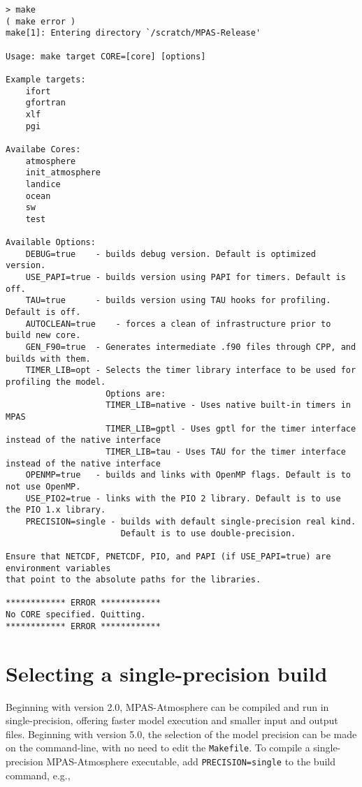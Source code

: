 {\small
\begin{verbatim}
> make
( make error )
make[1]: Entering directory `/scratch/MPAS-Release'

Usage: make target CORE=[core] [options]

Example targets:
    ifort
    gfortran
    xlf
    pgi

Availabe Cores:
    atmosphere
    init_atmosphere
    landice
    ocean
    sw
    test

Available Options:
    DEBUG=true    - builds debug version. Default is optimized version.
    USE_PAPI=true - builds version using PAPI for timers. Default is off.
    TAU=true      - builds version using TAU hooks for profiling. Default is off.
    AUTOCLEAN=true    - forces a clean of infrastructure prior to build new core.
    GEN_F90=true  - Generates intermediate .f90 files through CPP, and builds with them.
    TIMER_LIB=opt - Selects the timer library interface to be used for profiling the model.
                    Options are:
                    TIMER_LIB=native - Uses native built-in timers in MPAS
                    TIMER_LIB=gptl - Uses gptl for the timer interface instead of the native interface
                    TIMER_LIB=tau - Uses TAU for the timer interface instead of the native interface
    OPENMP=true   - builds and links with OpenMP flags. Default is to not use OpenMP.
    USE_PIO2=true - links with the PIO 2 library. Default is to use the PIO 1.x library.
    PRECISION=single - builds with default single-precision real kind.
                       Default is to use double-precision.

Ensure that NETCDF, PNETCDF, PIO, and PAPI (if USE_PAPI=true) are environment variables
that point to the absolute paths for the libraries.

************ ERROR ************
No CORE specified. Quitting.
************ ERROR ************
\end{verbatim}

\section{Selecting a single-precision build}

Beginning with version 2.0, MPAS-Atmosphere can be compiled and run in single-precision, offering faster 
model execution and smaller input and output files. Beginning with version 5.0, the selection of the
model precision can be made on the command-line, with no need to edit the {\tt Makefile}.
To compile a single-precision MPAS-Atmosphere executable, add {\tt PRECISION=single} to the build command, e.g.,

}
